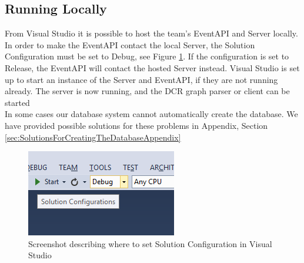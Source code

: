 \subsection{Running Locally\label{sec:RunningLocally}}
From Visual Studio it is possible to host the team’s EventAPI and Server locally. In order to make the EventAPI contact the local Server, the Solution Configuration must be set to Debug, see Figure \ref{fig:DebugModeScreenshot}. If the configuration is set to Release, the EventAPI will contact the hosted Server instead. \newline
Visual Studio is set up to start an instance of the Server and EventAPI, if they are not running already. The server is now running, and the DCR graph parser or client can be started \\

In some cases our database system cannot automatically create the database. We have provided possible solutions for these problems in Appendix, Section \ref{sec:SolutionsForCreatingTheDatabaseAppendix} 

\begin{figure}[h!]
\centering
\includegraphics{Figures/SolutionConfigurationsDebug}
\caption{\label{fig:DebugModeScreenshot} Screenshot describing where to set Solution Configuration in Visual Studio}
\end{figure}